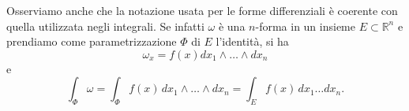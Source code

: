 \documentclass[italian,a4paper]{scrartcl}
\newcommand{\RR}{{\mathbb R}}
\renewcommand{\vec}{\mathbf}
\begin{document}
Osserviamo anche che la notazione usata per le forme differenziali è
coerente con quella utilizzata negli integrali. Se infatti $\omega$ è
una $n$-forma in un insieme $E\subset \RR^n$ e prendiamo come
parametrizzazione $\Phi$ di $E$ l'identità, si ha
\[
\omega_x = f(x) dx_1\wedge \dots \wedge dx_n
\]
e
\[
\int_\Phi \omega
= \int_\Phi f(x)\, dx_1 \wedge \dots \wedge dx_n
= \int_E f(x)\, dx_1\dots dx_n.
\]

\end{document}
